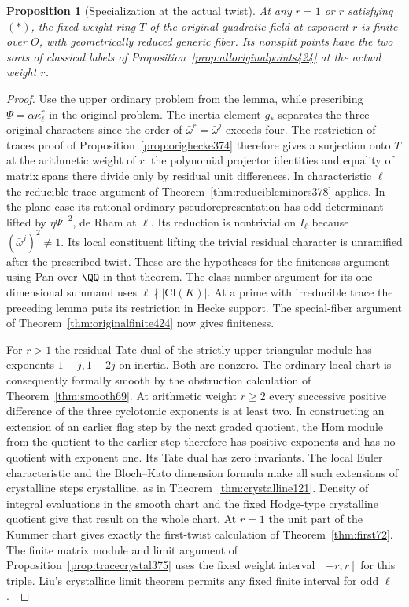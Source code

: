 \documentclass[a4paper,11pt]{article}
\newtheorem{proposition}{Proposition}[section]
\theoremstyle{definition}
\theoremstyle{remark}
\numberwithin{equation}{section}
\begin{document}
\begin{proposition}[Specialization at the actual twist]\leavevmode
\label{prop:weightshift426}
At any \(r=1\) or \(r\) satisfying \((*)\), the fixed-weight
ring \(T\) of the original quadratic field at exponent \(r\)
is finite over \(O\), with geometrically reduced generic
fiber. Its nonsplit points have the two sorts of classical
labels of Proposition~\ref{prop:alloriginalpoints424} at
the actual weight \(r\).
\end{proposition}
\begin{proof}
Use the upper ordinary problem from the lemma, while prescribing
\(\Psi=\alpha\kappa_\ell^r\) in the original problem. The
inertia element \(g_*\) separates the three original characters
since the order of \(\bar\omega^r=\bar\omega^j\) exceeds four.
The restriction-of-traces proof of
Proposition~\ref{prop:orighecke374} therefore gives a surjection
onto \(T\) at the arithmetic weight of \(r\): the polynomial
projector identities and equality of matrix spans there divide
only by residual unit differences. In characteristic \(\ell\)
the reducible trace argument of
Theorem~\ref{thm:reducibleminors378} applies. In the plane
case its rational ordinary pseudorepresentation has odd
determinant lifted by \(\eta\Psi^{-2}\), de Rham at \(\ell\).
Its reduction is nontrivial on \(I_\ell\) because
\((\bar\omega^j)^2\ne1\). Its local constituent lifting
the trivial residual character is unramified after the
prescribed twist. These are the hypotheses for the finiteness
argument using Pan over \(\QQ\) in that theorem. The
class-number argument for its one-dimensional summand uses
\(\ell\nmid|\mathrm{Cl}(K)|\). At a prime with irreducible
trace the preceding lemma puts its restriction in Hecke
support. The special-fiber argument of
Theorem~\ref{thm:originalfinite424} now gives finiteness.

For \(r>1\) the residual Tate dual of the strictly upper
triangular module has exponents \(1-j,1-2j\) on inertia.
Both are nonzero. The ordinary local chart is consequently
formally smooth by the obstruction calculation of
Theorem~\ref{thm:smooth69}. At arithmetic weight \(r\ge2\)
every successive positive difference of the three cyclotomic
exponents is at least two. In constructing an extension of an
earlier flag step by the next graded quotient, the Hom module
from the quotient to the earlier step therefore has positive
exponents and has no quotient with exponent one. Its Tate
dual has zero invariants. The local Euler characteristic and
the Bloch--Kato dimension formula make all such extensions
of crystalline steps crystalline, as in
Theorem~\ref{thm:crystalline121}. Density of integral
evaluations in the smooth chart and the fixed Hodge-type
crystalline quotient give that result on the whole chart.
At \(r=1\) the unit part of the Kummer chart gives exactly
the first-twist calculation of Theorem~\ref{thm:first72}.
The finite matrix module and limit argument of
Proposition~\ref{prop:tracecrystal375} uses the fixed weight
interval \([-r,r]\) for this triple. Liu's crystalline
limit theorem permits any fixed finite interval for odd
\(\ell\).~\cite{XI-VIII-liu375,XI-VIII-VI-kisin121}


\end{proof}
\end{document}
